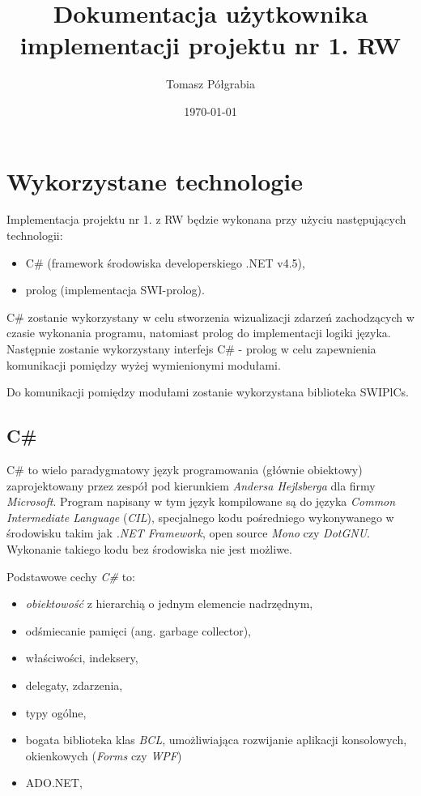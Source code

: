 \documentclass[a4paper]{article}
\title{Dokumentacja użytkownika implementacji projektu nr 1. RW}
\author{Tomasz Półgrabia}
\date{\today}
\begin{document}
\maketitle

\begin{abstract}

\end{abstract}

\section{Wykorzystane technologie}
	Implementacja projektu nr 1. z RW będzie wykonana przy użyciu następujących technologii:
    \begin{itemize}
    	\item C\# (framework środowiska developerskiego .NET v4.5),
        \item prolog (implementacja SWI-prolog).
    \end{itemize}
    
    C\# zostanie wykorzystany w celu stworzenia wizualizacji zdarzeń zachodzących w czasie wykonania
    programu, natomiast prolog do implementacji logiki języka. Następnie zostanie wykorzystany
    interfejs C\# - prolog w celu zapewnienia komunikacji pomiędzy wyżej wymienionymi modułami.
    
    Do komunikacji pomiędzy modułami zostanie wykorzystana biblioteka SWIPlCs.
    
    \subsection{C\#}
    C\# to wielo paradygmatowy język programowania (głównie obiektowy)
    zaprojektowany przez zespół pod kierunkiem \textit{Andersa Hejlsberga}
    dla firmy \textit{Microsoft}. Program napisany w tym język kompilowane są
    do języka \textit{Common Intermediate Language} (\textit{CIL}),
    specjalnego kodu pośredniego wykonywanego w środowisku takim jak 
    \textit{.NET Framework}, open source \textit{Mono} czy \textit{DotGNU}.
    Wykonanie takiego kodu bez środowiska nie jest możliwe.

    Podstawowe cechy \textit{C\#} to:
    \begin{itemize}
        \item \textit{obiektowość} z hierarchią o jednym elemencie nadrzędnym,
        \item odśmiecanie pamięci (ang. garbage collector),
        \item właściwości, indeksery,
        \item delegaty, zdarzenia,
        \item typy ogólne,
        \item bogata biblioteka klas \textit{BCL}, umożliwiająca rozwijanie
            aplikacji konsolowych, okienkowych (\textit{Forms} czy \textit{WPF})
        \item ADO.NET,
    \end{itemize}
\end{document}
